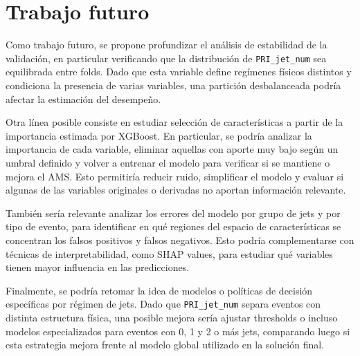 \documentclass{article}
\begin{document}
\section{Trabajo futuro}

Como trabajo futuro, se propone profundizar el análisis de estabilidad de la validación, en particular verificando que la distribución de \texttt{PRI\_jet\_num} sea equilibrada entre folds. Dado que esta variable define regímenes físicos distintos y condiciona la presencia de varias variables, una partición desbalanceada podría afectar la estimación del desempeño.

Otra línea posible consiste en estudiar selección de características a partir de la importancia estimada por XGBoost. En particular, se podría analizar la importancia de cada variable, eliminar aquellas con aporte muy bajo según un umbral definido y volver a entrenar el modelo para verificar si se mantiene o mejora el AMS. Esto permitiría reducir ruido, simplificar el modelo y evaluar si algunas de las variables originales o derivadas no aportan información relevante.

También sería relevante analizar los errores del modelo por grupo de jets y por tipo de evento, para identificar en qué regiones del espacio de características se concentran los falsos positivos y falsos negativos. Esto podría complementarse con técnicas de interpretabilidad, como SHAP values, para estudiar qué variables tienen mayor influencia en las predicciones.

Finalmente, se podría retomar la idea de modelos o políticas de decisión específicas por régimen de jets. Dado que \texttt{PRI\_jet\_num} separa eventos con distinta estructura física, una posible mejora sería ajustar thresholds o incluso modelos especializados para eventos con 0, 1 y 2 o más jets, comparando luego si esta estrategia mejora frente al modelo global utilizado en la solución final.

 
\end{document}
